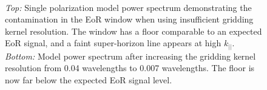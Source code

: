\documentclass[iop]{emulateapj}
\begin{document}
\begin{figure}
\begin{center}
~
\caption{
\emph{Top:} Single polarization model power spectrum demonstrating the contamination in 
the EoR window when using insufficient gridding kernel resolution. The window has a floor 
comparable to an expected EoR signal, and a faint super-horizon line appears at high 
$k_{||}$. \emph{Bottom:} Model power spectrum after increasing the gridding kernel 
resolution from 0.04 wavelengths to 0.007 wavelengths. The floor is now far below the 
expected EoR signal level. 
\label{fig:beam_res}
}
\end{center}
\end{figure}
\end{document}
